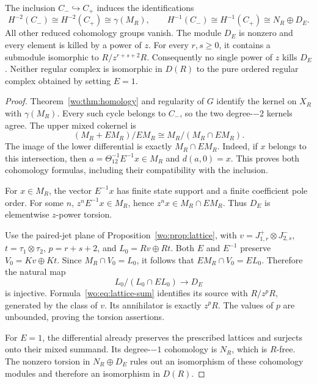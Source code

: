 \begin{theorem}\label{woreg:thm:torsion}
The inclusion \(C_-\hookrightarrow C_+\) induces the identifications
\[
 H^{-2}(C_-)\cong H^{-2}(C_+)\cong\gamma(M_R),\qquad
 H^{-1}(C_-)\cong H^{-1}(C_+)\cong N_R\oplus D_E.
\]
All other reduced cohomology groups vanish.  The module \(D_E\) is
nonzero and every element is killed by a power of \(z\).  For every
\(r,s\ge0\), it contains a submodule isomorphic to
\(R/z^{r+s+2}R\).  Consequently no single power of \(z\) kills
\(D_E\).  Neither regular complex is isomorphic in \(D(R)\) to
the pure ordered regular complex obtained by setting \(E=1\).
\end{theorem}
\begin{proof}
Theorem~\ref{wo:thm:homology} and regularity of \(G\) identify the
kernel on \(X_R\) with \(\gamma(M_R)\).  Every such cycle belongs
to \(C_-\), so the two degree-\(-2\) kernels agree.  The upper
mixed cokernel is
\[
 (M_R+EM_R)/EM_R\cong M_R/(M_R\cap EM_R).
\]
The image of the lower differential is exactly \(M_R\cap EM_R\).
Indeed, if \(x\) belongs to this intersection, then
\(a=\Theta_{12}^{-1}E^{-1}x\in M_R\) and
\(d(a,0)=x\).  This proves both cohomology formulas, including
their compatibility with the inclusion.

For \(x\in M_R\), the vector \(E^{-1}x\) has finite state
support and a finite coefficient pole order.  For some \(n\),
\(z^nE^{-1}x\in M_R\), hence
\(z^nx\in M_R\cap EM_R\).  Thus \(D_E\) is elementwise
\(z\)-power torsion.

Use the paired-jet plane of Proposition~\ref{wo:prop:lattice}, with
\(v=J_{1,r}^+\otimes J_{2,s}^-\),
\(t=\tau_1\otimes\tau_2\), \(p=r+s+2\), and
\(L_0=Rv\oplus Rt\).  Both \(E\) and \(E^{-1}\) preserve
\(V_0=Kv\oplus Kt\).  Since \(M_R\cap V_0=L_0\), it follows
that \(EM_R\cap V_0=EL_0\).  Therefore the natural map
\[
 L_0/(L_0\cap EL_0)\longrightarrow D_E
\]
is injective.  Formula~\eqref{wo:eq:lattice-sum} identifies its source
with \(R/z^pR\), generated by the class of \(v\).
Its annihilator is exactly \(z^pR\).  The values of \(p\) are
unbounded, proving the torsion assertions.

For \(E=1\), the differential already preserves the prescribed
lattices and surjects onto their mixed summand.  Its degree-\(-1\)
cohomology is \(N_R\), which is \(R\)-free.  The nonzero torsion
in \(N_R\oplus D_E\) rules out an isomorphism of these cohomology
modules and therefore an isomorphism in \(D(R)\).
\end{proof}

